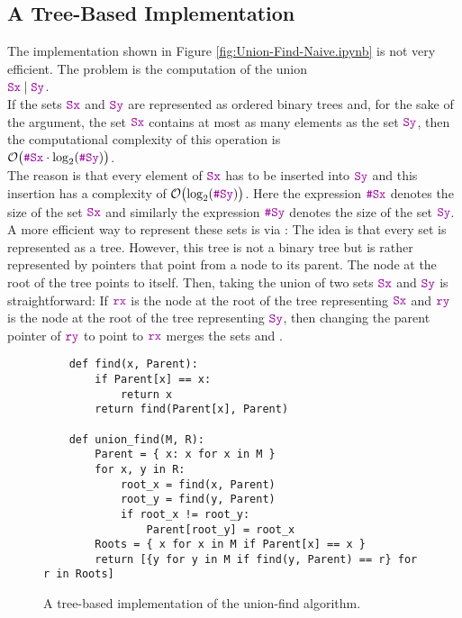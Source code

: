 \subsection{A Tree-Based Implementation}
The implementation shown in Figure \ref{fig:Union-Find-Naive.ipynb} is not very efficient.  The
problem is the computation of the union
\\
\hspace*{1.3cm}
$\mytt{Sx} \;|\; \mytt{Sy}$.
\\[0.2cm]
If the sets $\mytt{Sx}$ and $\mytt{Sy}$ are represented as ordered binary trees and, for the sake of the
argument, the set $\mytt{Sx}$ contains at most as many elements as the set $\mytt{Sy}$, then the
computational complexity of this operation is
\\
\hspace*{1.3cm}
$\Oh\bigl(\mytt{\#Sx} \cdot \log_2(\mytt{\#Sy})\bigr)$.  
\\[0.2cm]
The reason is that every element of $\mytt{Sx}$ has to be inserted into $\mytt{Sy}$ and this
insertion has a complexity of $\Oh\bigl(\log_2(\mytt{\#Sy})\bigr)$.  Here the expression
$\mytt{\#Sx}$ denotes the size of the set $\mytt{Sx}$ and similarly the expression
$\mytt{\#Sy}$ denotes the size of the set $\mytt{Sy}$.  A more efficient way to
represent these sets is via :  The idea is that every set is represented as a
tree.  However, this tree is not a binary tree but is rather represented by pointers that
point from a node to its parent.  The node at the root of the tree points to itself.  Then, taking the
union of two sets $\mytt{Sx}$ and $\mytt{Sy}$ is straightforward:  If $\mytt{rx}$ is the node at the root of
the tree representing $\mytt{Sx}$ and $\mytt{ry}$ is the node at the root of the tree representing
$\mytt{Sy}$, then changing the parent pointer of $\mytt{ry}$ to point to $\mytt{rx}$ merges the
sets  and .


\begin{figure}[!ht]
\centering
\begin{verbatim}
    def find(x, Parent):
        if Parent[x] == x:
            return x
        return find(Parent[x], Parent)

    def union_find(M, R):
        Parent = { x: x for x in M } 
        for x, y in R:
            root_x = find(x, Parent)
            root_y = find(y, Parent)
            if root_x != root_y:
                Parent[root_y] = root_x
        Roots = { x for x in M if Parent[x] == x }
        return [{y for y in M if find(y, Parent) == r} for r in Roots]
\end{verbatim}
\vspace*{-0.3cm}
\caption{A tree-based implementation of the union-find algorithm.}
\label{fig:Union-Find-Tree.ipynb}
\end{figure}

